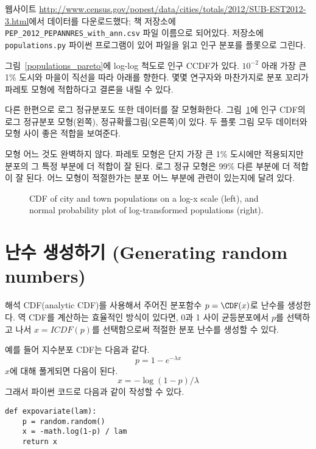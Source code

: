 웹사이트 \url{http://www.census.gov/popest/data/cities/totals/2012/SUB-EST2012-3.html}에서 데이터를 다운로드했다; 책 저장소에 \verb"PEP_2012_PEPANNRES_with_ann.csv" 파일 이름으로 되어있다.
저장소에 {\tt populations.py} 파이썬 프로그램이 있어 파일을 읽고 인구 분포를 플롯으로 그린다.

그림~\ref{populations_pareto}에 log-log 척도로 인구 CCDF가 있다.
$10^{-2}$ 아래 가장 큰 1\% 도시와 마을이 직선을 따라 아래를 향한다. 몇몇 연구자와 마찬가지로 분포 꼬리가 파레토 모형에 적합하다고 결론을 내릴 수 있다.

다른 한편으로 로그 정규분포도 또한 데이터를 잘 모형화한다. 
그림~\ref{populations_normal}에 인구 CDF의 로그 정규분포 모형(왼쪽), 정규확률그림(오른쪽)이 있다. 두 플롯 그림 모두 데이터와 모형 사이 좋은 적합을 보여준다.

모형 어느 것도 완벽하지 않다. 파레토 모형은 단지 가장 큰 1\% 도시에만 적용되지만 분포의 그 특정 부분에 더 적합이 잘 된다. 
로그 정규 모형은 99\% 다른 부분에 더 적합이 잘 된다.
어느 모형이 적절한가는 분포 어느 부분에 관련이 있는지에 달려 있다.

\begin{figure}
\caption{CDF of city and town populations on a log-x scale (left), and
normal probability plot of log-transformed populations (right).}
\label{populations_normal}
\end{figure}


\section{난수 생성하기 (Generating random numbers)}

해석 CDF(analytic CDF)를 사용해서 주어진 분포함수 $p = \CDF(x)$로 난수를 생성한다. 역 CDF를 계산하는 효율적인 방식이 있다면, 
0과 1 사이 균등분포에서 $p$를 선택하고 나서 $x = ICDF(p)$를 선택함으로써 적절한 분포 난수를 생성할 수 있다.

예를 들어 지수분포 CDF는 다음과 같다.
%
\[ p = 1 - e^{-\lambda x} \]
%
$x$에 대해 풀게되면 다음이 된다.
%
\[ x = -\log (1 - p) / \lambda \]
%
그래서 파이썬 코드로 다음과 같이 작성할 수 있다.
%
\begin{verbatim}
def expovariate(lam):
    p = random.random()
    x = -math.log(1-p) / lam
    return x
\end{verbatim}


